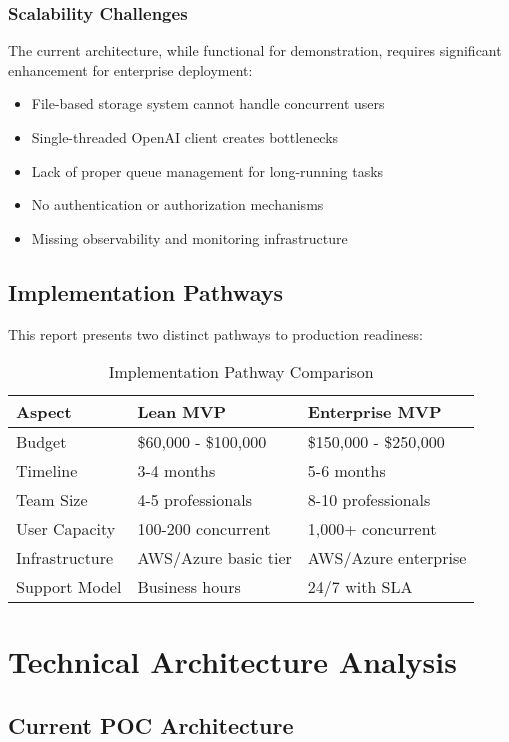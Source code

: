 \documentclass[12pt,a4paper]{report}
\begin{document}
\subsection{Scalability Challenges}
The current architecture, while functional for demonstration, requires significant enhancement for enterprise deployment:
\begin{itemize}
    \item File-based storage system cannot handle concurrent users
    \item Single-threaded OpenAI client creates bottlenecks
    \item Lack of proper queue management for long-running tasks
    \item No authentication or authorization mechanisms
    \item Missing observability and monitoring infrastructure
\end{itemize}

\section{Implementation Pathways}

This report presents two distinct pathways to production readiness:

\begin{table}[H]
\centering
\begin{tabularx}{\textwidth}{|l|X|X|}
\hline
\textbf{Aspect} & \textbf{Lean MVP} & \textbf{Enterprise MVP} \\
\hline
Budget & \$60,000 - \$100,000 & \$150,000 - \$250,000 \\
Timeline & 3-4 months & 5-6 months \\
Team Size & 4-5 professionals & 8-10 professionals \\
User Capacity & 100-200 concurrent & 1,000+ concurrent \\
Infrastructure & AWS/Azure basic tier & AWS/Azure enterprise \\
Support Model & Business hours & 24/7 with SLA \\
\hline
\end{tabularx}
\caption{Implementation Pathway Comparison}
\end{table}

\chapter{Technical Architecture Analysis}

\section{Current POC Architecture}
\end{document}

